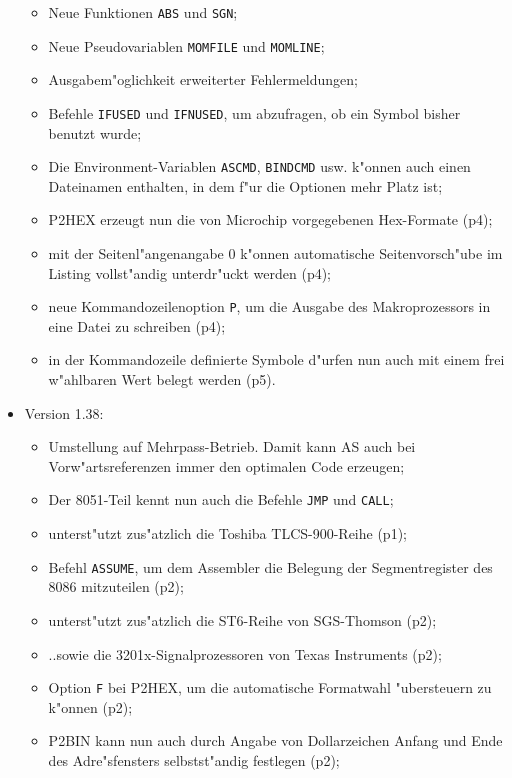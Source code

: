 \documentclass[12pt,a4paper,twoside]{report}
\newcommand{\tty}[1]{{\tt #1}}
\begin{document}
\begin{itemize}
{\begin{itemize}
      \item{Neue Funktionen \tty{ABS} und \tty{SGN};}
      \item{Neue Pseudovariablen \tty{MOMFILE} und \tty{MOMLINE};}
      \item{Ausgabem"oglichkeit erweiterter Fehlermeldungen;}
      \item{Befehle \tty{IFUSED} und \tty{IFNUSED}, um abzufragen, ob ein
            Symbol bisher benutzt wurde;}
      \item{Die Environment-Variablen \tty{ASCMD}, \tty{BINDCMD} usw. k"onnen auch
            einen Dateinamen enthalten, in dem f"ur die Optionen mehr
            Platz ist;}
      \item{P2HEX erzeugt nun die von Microchip vorgegebenen Hex-Formate
            (p4);}
      \item{mit der Seitenl"angenangabe 0 k"onnen automatische
            Seitenvorsch"ube im Listing vollst"andig unterdr"uckt werden
            (p4);}
      \item{neue Kommandozeilenoption \tty{P}, um die Ausgabe des Makroprozessors
            in eine Datei zu schreiben (p4);}
      \item{in der Kommandozeile definierte Symbole d"urfen nun auch mit
            einem frei w"ahlbaren Wert belegt werden (p5).}
      \end{itemize}}
\item{Version 1.38:
      \begin{itemize}
      \item{Umstellung auf Mehrpass-Betrieb.  Damit kann AS auch bei
            Vorw"artsreferenzen immer den optimalen Code erzeugen;}
      \item{Der 8051-Teil kennt nun auch die Befehle \tty{JMP} und \tty{CALL};}
      \item{unterst"utzt zus"atzlich die Toshiba TLCS-900-Reihe (p1);}
      \item{Befehl \tty{ASSUME}, um dem Assembler die Belegung der
            Segmentregister des 8086 mitzuteilen (p2);}
      \item{unterst"utzt zus"atzlich die ST6-Reihe von SGS-Thomson (p2);}
      \item{..sowie die 3201x-Signalprozessoren von Texas Instruments (p2);}
      \item{Option \tty{F} bei P2HEX, um die automatische Formatwahl "ubersteuern
            zu k"onnen (p2);}
      \item{P2BIN kann nun auch durch Angabe von Dollarzeichen Anfang und
            Ende des Adre"sfensters selbstst"andig festlegen (p2);}

\end{itemize}}
\end{itemize}
\end{document}
